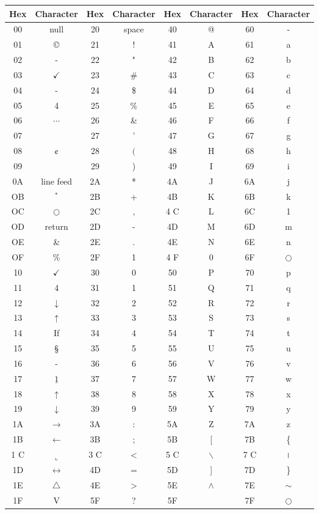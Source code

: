 \documentclass[10pt]{article}
\begin{document}
\begin{center}
\begin{tabular}{|c|c|c|c|c|c|c|c|}
\hline
Hex & Character & Hex & Character & Hex & Character & Hex & Character \\
\hline
00 & null & 20 & space & 40 & @ & 60 & - \\
\hline
01 & © & 21 & ! & 41 & A & 61 & a \\
\hline
02 & - & 22 & " & 42 & B & 62 & b \\
\hline
03 & $\checkmark$ & 23 & \# & 43 & C & 63 & c \\
\hline
04 & - & 24 & \$ & 44 & D & 64 & d \\
\hline
05 & 4 & 25 & \% & 45 & E & 65 & e \\
\hline
06 & $\cdots$ & 26 & \& & 46 & F & 66 & f \\
\hline
07 &  & 27 & ' & 47 & G & 67 & g \\
\hline
08 & ¢ & 28 & $($ & 48 & H & 68 & h \\
\hline
09 &  & 29 & ) & 49 & I & 69 & i \\
\hline
0A & line feed & 2A & * & 4A & J & 6A & j \\
\hline
OB & ${ }^{*}$ & 2B & + & 4B & K & 6B & k \\
\hline
OC & $\bigcirc$ & 2C & , & 4 C & L & 6C & 1 \\
\hline
OD & return & 2D & - & 4D & M & 6D & m \\
\hline
OE & \& & 2E & . & 4E & N & 6E & n \\
\hline
OF & \% & 2F & 1 & 4 F & 0 & 6F & $\bigcirc$ \\
\hline
10 & $\checkmark$ & 30 & 0 & 50 & P & 70 & p \\
\hline
11 & 4 & 31 & 1 & 51 & Q & 71 & q \\
\hline
12 & $\downarrow$ & 32 & 2 & 52 & R & 72 & r \\
\hline
13 & $\uparrow$ & 33 & 3 & 53 & S & 73 & s \\
\hline
14 & If & 34 & 4 & 54 & T & 74 & t \\
\hline
15 & § & 35 & 5 & 55 & U & 75 & u \\
\hline
16 & - & 36 & 6 & 56 & V & 76 & v \\
\hline
17 & $\underline{1}$ & 37 & 7 & 57 & W & 77 & w \\
\hline
18 & $\uparrow$ & 38 & 8 & 58 & X & 78 & x \\
\hline
19 & $\downarrow$ & 39 & 9 & 59 & Y & 79 & y \\
\hline
1A & $\rightarrow$ & 3A & : & 5A & Z & 7A & z \\
\hline
1B & $\leftarrow$ & 3B & ; & 5B & [ & 7B & \{ \\
\hline
1 C & $\llcorner$ & 3 C & < & 5 C & $\backslash$ & 7 C & । \\
\hline
1D & $\leftrightarrow$ & 4D & $=$ & 5D & ] & 7D & \} \\
\hline
1E & $\triangle$ & 4E & > & 5E & $\wedge$ & 7E & $\sim$ \\
\hline
1F & V & 5F & ? & 5F &  & 7F & $\bigcirc$ \\
\hline
\end{tabular}
\end{center}
\end{document}
